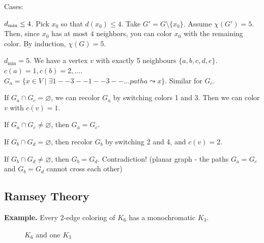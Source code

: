 Cases: \\
\begin{compactenum}
  \item $d_{\text{min}} \leq 4$. Pick $x_0$ so that $d(x_0) \leq 4$.
Take $G' = G \setminus \{x_0\}$. Assume $\chi(G')=5$. Then, since $x_0$ has at most $4$ neighbors, you can color $x_0$ with the remaining color. By induction, $\chi(G)=5$.

  \item $d_{\text{min}}=5$.
We have a vertex $v$ with exactly 5 neighbours $\{a,b,c,d,e\}$.
$c(a) = 1, c(b) = 2,\ldots$.
\\
$G_a = \{x\in V\mid \exists 1--3--1--3--\ldots path a \leadsto x\}$.
Similar for $G_c$.
  \begin{compactenum}
    \item If $G_a\cap G_c =\varnothing$, we can recolor $G_a$ by switching colors 1 and 3. Then we can color $v$ with $c(v) = 1$.

    \item If $G_a\cap G_c ≠ \varnothing$, then $G_a = G_c$.
    \begin{compactenum}
      \item If $G_b\cap G_d =\varnothing$, then recolor $G_b$ by switching 2 and 4, and $c(v) = 2$.
      \item If $G_b\cap G_d ≠\varnothing$, then $G_b = G_d$. Contradiction! (planar graph - the paths $G_a=G_c$ and $G_b=G_d$ cannot cross each other)
    \end{compactenum}
  \end{compactenum}
\end{compactenum}

\subsection*{Ramsey Theory}

\textbf{Example.} Every 2-edge coloring of $K_6$ has a monochromatic $K_3$.

\begin{figure}[htb]
  \centering
  \caption{$K_6$ and one $K_3$}
\end{figure}

